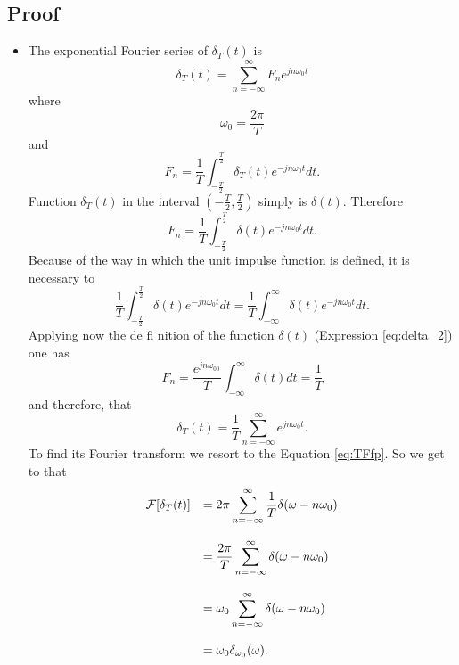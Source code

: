 \subsection*{Proof}
\begin{itemize}
\item [] The exponential Fourier series of $\delta_T(t)$ is
  \begin{equation*}
    \delta_T(t)=\sum_{n=-\infty}^{\infty}F_ne^{jn\omega_0t}
  \end{equation*}
  where
  \begin{equation*}
    \omega_0 = \frac{2\pi}{T}
  \end{equation*}
  and
  \begin{equation*}
    F_n = \frac{1}{T}\int_{-\frac{T}{2}}^{\frac{T}{2}}\delta_T(t)e^{-jn\omega_0t}dt.
  \end{equation*}
  Function $\delta_T(t)$ in the interval
  $(-\frac{T}{2},\frac{T}{2})$ simply is $\delta(t)$. Therefore
  \begin{equation*}
  F_n = \frac{1}{T}\int_{-\frac{T}{2}}^{\frac{T}{2}}\delta(t)e^{-jn\omega_0t}dt.
  \end{equation*}
  Because of the way in which the unit impulse function is defined, it
  is necessary to
  \begin{equation*}
    \frac{1}{T}\int_{-\frac{T}{2}}^{\frac{T}{2}}\delta(t)e^{-jn\omega_0t}dt =
    \frac{1}{T}\int_{-\infty}^{\infty}\delta(t)e^{-jn\omega_0t}dt.
  \end{equation*}
  Applying now the de fi nition of the function $\delta(t)$
  (Expression \ref{eq:delta_2}) one has
  \begin{equation*}
  F_n = \frac{e^{jn\omega_00}}{T}\int_{-\infty}^{\infty}\delta(t)dt = \frac{1}{T}
  \end{equation*}
  and therefore, that
  \begin{equation*}
  \delta_T(t) = \frac{1}{T}\sum_{n=-\infty}^{\infty}e^{jn\omega_0t}.
  \end{equation*}
  To find its Fourier transform we resort to the Equation
  \ref{eq:TFfp}. So we get to that
  \begin{equation*}
    \begin{array}{rl}
      {\cal F}[\delta_T(t)] & =
      2\pi\displaystyle\sum_{n=-\infty}^\infty\frac{1}{T}\delta(\omega-n\omega_0)\\\\
      & =
      \displaystyle\frac{2\pi}{T}\sum_{n=-\infty}^\infty\delta(\omega-n\omega_0)\\\\
      & = \omega_0\displaystyle\sum_{n=-\infty}^\infty\delta(\omega-n\omega_0)\\\\
      & = \omega_0\delta_{\omega_0}(\omega).
    \end{array}
  \end{equation*}
\end{itemize}

